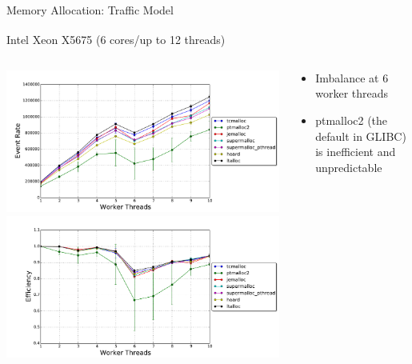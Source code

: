 \documentclass[10pt]{beamer}
\begin{document}
\begin{frame}{Memory Allocation: Traffic Model}
  \medskip
    \begin{block}{Intel\textsuperscript{\textregistered} Xeon\textsuperscript{\textregistered} X5675
        (6 cores/up to 12 threads)}
        \begin{columns}
        \begin{column}{0.7\textwidth}
            \smallskip
            \includegraphics[width=\textwidth]{../figs/memory_allocation/traffic_eventrate.pdf} \\[-0.2in]
            \includegraphics[width=\textwidth]{../figs/memory_allocation/traffic_efficiency.pdf}
        \end{column}
        \begin{column}{0.3\textwidth}
          \begin{small}
            \begin{itemize}
                \item Imbalance at 6 worker threads
                  \bigskip
                  \bigskip
                \item ptmalloc2 (the default in GLIBC) is inefficient and unpredictable
            \end{itemize}
          \end{small}
        \end{column}
        \end{columns}
    \end{block}
\end{frame}
\end{document}

